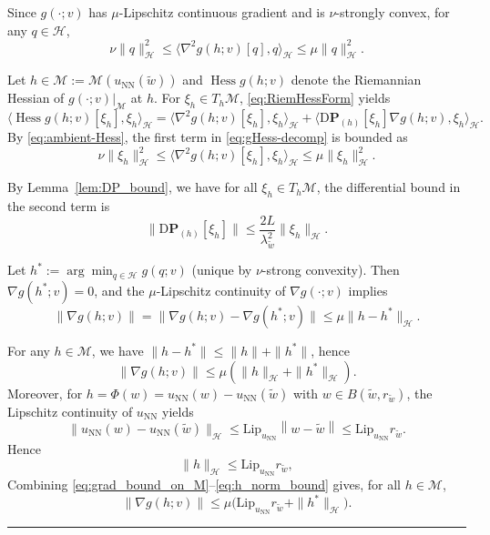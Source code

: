 \documentclass[twoside,11pt]{article}
\newcommand{\BlackBoxProof}{\rule{1.5ex}{1.5ex}}
\renewenvironment{proof}{\par\noindent{\bf Proof\ }}{\hfill\BlackBoxProof\par\medskip}
\newcommand{\nm}[1]{\left\lVert#1\right\rVert}
\renewcommand{\P}{\mathbf{P}}
\newcommand{\D}{\mathrm{D}}
\newcommand{\Hess}{\operatorname{Hess} }
\newcommand{\NN}{\mathrm{NN}}
\newcommand{\Lip}{\mathrm{Lip}}
\begin{document}
\begin{proof}
Since $g(\cdot;v)$ has $\mu$-Lipschitz continuous
gradient and is $\nu$-strongly convex, for any $q\in\mathcal H$,
\begin{equation}\label{eq:ambient-Hess}
\nu \|q\|_{\mathcal H}^2 \le \langle\nabla^2 g(h;v)[q],q\rangle_{\mathcal H}
 \le \mu \|q\|_{\mathcal H}^2 .
\end{equation}

Let $h\in\mathcal{M}:=\mathcal{M}(u_\NN(\tilde w))$ and $\Hess g(h;v)$ denote the Riemannian Hessian
of $g(\cdot;v)|_{\mathcal M}$ at $h$.
For $\xi_h \in T_h\mathcal M$, \eqref{eq:RiemHessForm} yields
\begin{equation}\label{eq:gHess-decomp}
\langle \Hess g(h;v)[\xi_h],\xi_h\rangle_{\mathcal H}
 = \langle\nabla^2 g(h;v)[\xi_h],\xi_h\rangle_{\mathcal H}
   + \langle\D \P_{(h)}[\xi_h] \nabla g(h;v) , \xi_h \rangle_{\mathcal H}.
\end{equation}
By \eqref{eq:ambient-Hess}, the first term in \eqref{eq:gHess-decomp} is bounded as
\begin{equation}\label{eq:term1_bounds}
\nu\|\xi_h\|_{\mathcal H}^2
\le \langle\nabla^2 g(h;v)[\xi_h],\xi_h\rangle_{\mathcal H}
\le \mu\|\xi_h\|_{\mathcal H}^2.
\end{equation}

By Lemma~\ref{lem:DP_bound}, we have for all $\xi_h\in T_h\mathcal M$, the differential bound in the second term is
\begin{equation}\label{eq:DP_bound_recall}
\|\D \P_{(h)}[\xi_h]\|
 \le  \frac{2L}{\lambda_{\tilde w}^2} \|\xi_h\|_{\mathcal H}.
\end{equation}

Let $h^*:=\arg\min_{q\in\mathcal H} g(q;v)$ (unique by $\nu$-strong convexity). Then
$\nabla g(h^*;v)=0$, and the $\mu$-Lipschitz continuity of $\nabla g(\cdot;v)$ implies
\begin{equation}\label{eq:grad_Lip_mu}
\|\nabla g(h;v)\|
=\|\nabla g(h;v)-\nabla g(h^*;v)\|
\le \mu \|h-h^*\|_{\mathcal H}.
\end{equation}

For any $h\in\mathcal M$, we have $\|h-h^*\|\le \|h\|+\|h^*\|$, hence
\begin{equation}\label{eq:grad_bound_on_M}
\|\nabla g(h;v)\|\le \mu(\|h\|_{\mathcal H}+\|h^*\|_{\mathcal H}).
\end{equation}
Moreover, for $h=\Phi(w)=u_\NN(w)-u_\NN(\tilde w)$ with $w\in B(\tilde w,r_{\tilde w})$, the Lipschitz continuity of $u_\NN$ yields
\[
\|u_\NN(w)-u_\NN(\tilde w)\|_{\mathcal H}
\le \Lip_{u_\NN}\nm{w - \tilde w} \le \Lip_{u_\NN} r_{\tilde w}.
\]
Hence
\begin{equation}\label{eq:h_norm_bound}
\|h\|_{\mathcal H}\le \Lip_{u_\NN} r_{\tilde w},
\end{equation}
Combining \eqref{eq:grad_bound_on_M}--\eqref{eq:h_norm_bound} gives, for all $h\in\mathcal M$,
\begin{equation}\label{eq:grad_uniform_M}
\|\nabla g(h;v)\|\le \mu\big( \Lip_{u_\NN} r_{\tilde w}  +\|h^*\|_{\mathcal H}\big).
\end{equation}


\end{proof}
\end{document}
